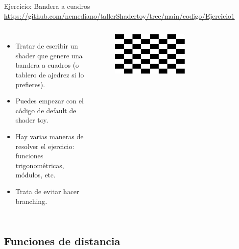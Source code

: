 \begin{frame}{Ejercicio: Bandera a cuadros}
\url{https://github.com/nemediano/tallerShadertoy/tree/main/codigo/Ejercicio1}
\begin{columns}
     \begin{itemize}
         \item Tratar de escribir un shader que genere una bandera a cuadros (o tablero de ajedrez si lo prefieres).
         \item Puedes empezar con el código de default de shader toy.
         \item Hay varias maneras de resolver el ejercicio: funciones trigonométricas, módulos, etc.
         \item Trata de evitar hacer branching.
     \end{itemize}
        \begin{figure}[htb]
            \centering
            \includegraphics[width=0.6\textwidth]{img/Ejer/Ejer1}
        \end{figure}
\end{columns}
\end{frame}


\subsection{Funciones de distancia}

